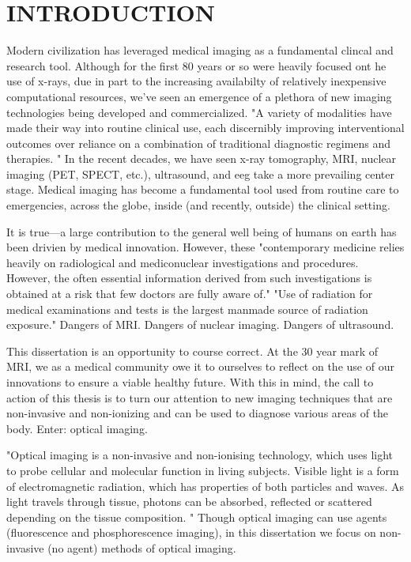 
\chapter{INTRODUCTION} %
\label{chap:introduction}

Modern civilization has leveraged medical imaging as a fundamental clincal and research tool. Although for the first 80 years or so were heavily focused ont he use of x-rays, due in part to the increasing availabilty of relatively inexpensive computational resources, we've seen an emergence of a plethora of new imaging technologies being developed and commercialized. "A variety of modalities have made their way into routine clinical use, each discernibly improving interventional outcomes over reliance on a combination of traditional diagnostic regimens and therapies. " In the recent decades, we have seen x-ray tomography, MRI, nuclear imaging (PET, SPECT, etc.), ultrasound, and eeg take a more prevailing center stage. Medical imaging has become a fundamental tool used from routine care to emergencies, across the globe, inside (and recently, outside) the clinical setting.  

It is true---a large contribution to the general well being of humans on earth has been drivien by medical innovation. However, these "contemporary medicine relies heavily on radiological and mediconuclear investigations and procedures. However, the often essential information derived from such investigations is obtained at a risk that few doctors are fully aware of."  "Use of radiation for medical examinations and tests is the largest manmade source of radiation exposure." Dangers of MRI. Dangers of nuclear imaging. Dangers of ultrasound. 

This dissertation is an opportunity to course correct. At the 30 year mark of MRI, we as a medical community owe it to ourselves to reflect on the use of our innovations to ensure a viable healthy future. With this in mind, the call to action of this thesis is to turn our attention to new imaging techniques that are non-invasive and non-ionizing and can be used to diagnose various areas of the body.  Enter: optical imaging. 


"Optical imaging is a non-invasive and non-ionising technology, which uses light to probe cellular and molecular function in living subjects. Visible light is a form of electromagnetic radiation, which has properties of both particles and waves. As light travels through tissue, photons can be absorbed, reflected or scattered depending on the tissue composition. "  Though optical imaging can use agents (fluorescence and phosphorescence imaging), in this dissertation we focus on non-invasive (no agent) methods of optical imaging. 

